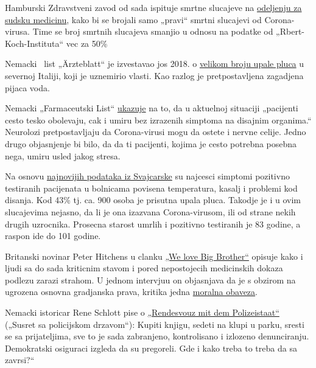 Hamburski Zdravstveni zavod od sada ispituje smrtne slucajeve na
\href{https://www.t-online.de/nachrichten/deutschland/id_87636856/coronavirus-hamburg-will-nur-echte-covid-19-tote-zaehlen.html}{odeljenju
za sudsku medicinu}, kako bi se brojali samo „pravi`` smrtni slucajevi
od Corona-virusa. Time se broj smrtnih slucajeva smanjio u odnosu na
podatke od „Rbert-Koch-Instituta`` vec za 50\%

Nemacki ~list „Ärzteblatt`` je izvestavao jos 2018. o
\href{https://www.aerzteblatt.de/nachrichten/97750/Vielzahl-an-Lungenentzuendungen-beunruhigen-Behoerden-in-Norditalien}{velikom
broju upale pluca} u severnoj Italiji, koji je uznemirio vlasti. Kao
razlog je pretpostavljena zagadjena pijaca voda.

Nemacki „Farmaceutski List``
\href{https://www.pharmazeutische-zeitung.de/atemstillstand-koennte-auch-zentrale-ursache-haben-116664/}{ukazuje}
na to, da u aktuelnoj situaciji „pacijenti cesto tesko obolevaju, cak i
umiru bez izrazenih simptoma na disajnim organima.`` Neurolozi
pretpostavljaju da Corona-virusi mogu da ostete i nervne celije. Jedno
drugo objasnjenje bi bilo, da da ti pacijenti, kojima je cesto potrebna
posebna nega, umiru usled jakog stresa.

Na osnovu \href{https://swprs.org/covid-19.hinweis-ii/}{najnovijih
podataka iz Svajcarske} su najcesci simptomi pozitivno testiranih
pacijenata u bolnicama povisena temperatura, kasalj i problemi kod
disanja. Kod 43\% tj. ca. 900 osoba je prisutna upala pluca. Takodje je
i u ovim slucajevima nejasno, da li je ona izazvana Corona-virusom, ili
od strane nekih drugih uzrocnika. Prosecna starost umrlih i pozitivno
testiranih je 83 godine, a raspon ide do 101 godine.

Britanski novinar Peter Hitchens u clanku
\href{https://www.firstthings.com/web-exclusives/2020/04/we-love-big-brother}{„We
love Big Brother``} opisuje kako i ljudi sa do sada kriticnim stavom i
pored nepostojecih medicinskih dokaza podlezu zarazi strahom. U jednom
intervjuu on objasnjava da je s obzirom na ugrozena osnovna gradjanska
prava, kritika jedna
\href{https://www.spiked-online.com/podcast-episode/in-this-lockdown-dissent-is-a-moral-duty/}{moralna
obaveza}.

Nemacki istoricar Rene Schlott pise o
\href{https://www.spiegel.de/consent-a-?targetUrl=https\%3A\%2F\%2Fwww.spiegel.de\%2Fpolitik\%2Fdeutschland\%2Fcorona-krise-und-buergerrechte-rendezvous-mit-dem-polizeistaat-a-68611322-f4d4-453f-aba5-5ec5a49ae329\&ref=https\%3A\%2F\%2Fswprs.org\%2Fcovid-19.hinweis-ii\%2F}{„Rendesvouz
mit dem Polizeistaat``} („Susret sa policijskom drzavom``): Kupiti
knjigu, sedeti na klupi u parku, sresti se sa prijateljima, sve to je
sada zabranjeno, kontrolisano i izlozeno denunciranju. Demokratski
osiguraci izgleda da su pregoreli. Gde i kako treba to treba da sa
zavrsi?``

